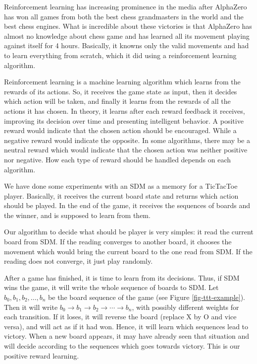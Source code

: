 Reinforcement learning has increasing prominence in the media after AlphaZero has won all games from both the best chess grandmasters in the world and the best chess engines. What is incredible about these victories is that AlphaZero has almost no knowledge about chess game and has learned all its movement playing against itself for 4 hours. Basically, it knowns only the valid movements and had to learn everything from scratch, which it did using a reinforcement learning algorithm.

Reinforcement learning is a machine learning algorithm which learns from the rewards of its actions. So, it receives the game state as input, then it decides which action will be taken, and finally it learns from the rewards of all the actions it has chosen. In theory, it learns after each reward feedback it receives, improving its decision over time and presenting intelligent behavior. A positive reward would indicate that the chosen action should be encouraged. While a negative reward would indicate the opposite. In some algorithms, there may be a neutral reward which would indicate that the chosen action was neither positive nor negative. How each type of reward should be handled depends on each algorithm.

We have done some experiments with an SDM as a memory for a TicTacToe player. Basically, it receives the current board state and returns which action should be played. In the end of the game, it receives the sequences of boards and the winner, and is supposed to learn from them.

Our algorithm to decide what should be player is very simples: it read the current board from SDM. If the reading converges to another board, it chooses the movement which would bring the current board to the one read from SDM. If the reading does not converge, it just play randomly.

After a game has finished, it is time to learn from its decisions. Thus, if SDM wins the game, it will write the whole sequence of boards to SDM. Let $b_0, b_1, b_2, \dots, b_n$ be the board sequence of the game (see Figure \ref{fig-ttt-example}). Then it will write $b_0 \rightarrow b_1 \rightarrow b_2 \rightarrow \cdots \rightarrow b_n$, with possibly different weights for each transition. If it loses, it will reverse the board (replace X by O and vice versa), and will act as if it had won. Hence, it will learn which sequences lead to victory. When a new board appears, it may have already seen that situation and will decide according to the sequences which goes towards victory. This is our positive reward learning.

